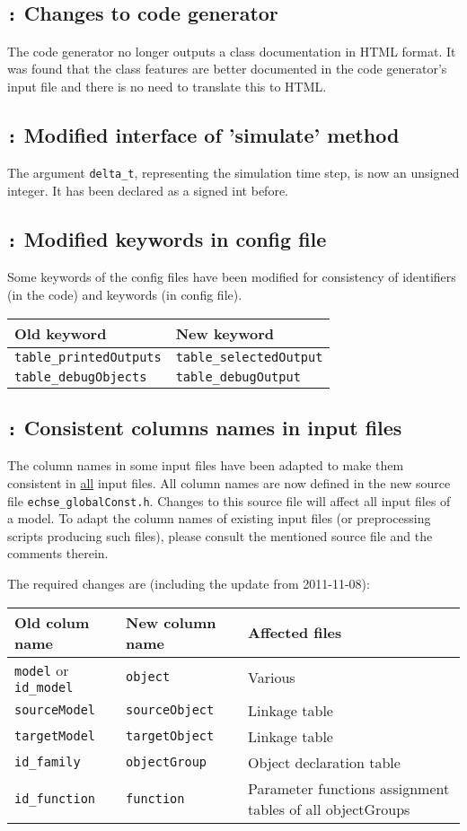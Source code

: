 \documentclass[a4paper,10pt]{article}
\newcommand{\logentry}[2]{\subsection*{\texttt{\color{red}{#1}:} \large{\textbf{#2}}}}
\begin{document}
\FloatBarrier

\logentry{2011-11-30}{Changes to code generator}
The code generator no longer outputs a class documentation in HTML format. It was found that the class features are better documented in the code generator's input file and there is no need to translate this to HTML.

\logentry{2011-11-27}{Modified interface of 'simulate' method}
The argument \verb!delta_t!, representing the simulation time step, is now an unsigned integer. It has been declared as a signed int before.

\logentry{2011-11-14}{Modified keywords in config file}
Some keywords of the config files have been modified for consistency of identifiers (in the code) and keywords (in config file).

\medskip
\begin{tabular}{ll} \hline
\textbf{Old keyword} & \textbf{New keyword} \\ \hline
\verb!table_printedOutputs! & \verb!table_selectedOutput! \\
\verb!table_debugObjects! & \verb!table_debugOutput! \\ \hline
\end{tabular}

\logentry{2011-11-10}{Consistent columns names in input files}
The column names in some input files have been adapted to make them consistent in \underline{all} input files. All column names are now defined in the new source file \verb!echse_globalConst.h!. Changes to this source file will affect all input files of a model. To adapt the column names of existing input files (or preprocessing scripts producing such files), please consult the mentioned source file and the comments therein.

The required changes are (including the update from 2011-11-08):

\medskip
\begin{tabular}{llp{}} \hline
  \textbf{Old colum name} & \textbf{New column name} & \textbf{Affected files} \\ \hline
  \verb!model! or \verb!id_model! & \verb!object! & Various \\
  \verb!sourceModel! & \verb!sourceObject! & Linkage table \\
  \verb!targetModel! & \verb!targetObject! & Linkage table \\
  \verb!id_family! & \verb!objectGroup! & Object declaration table \\
  \verb!id_function! & \verb!function! & Parameter functions assignment tables of all objectGroups \\ \hline
\end{tabular}
\end{document}
